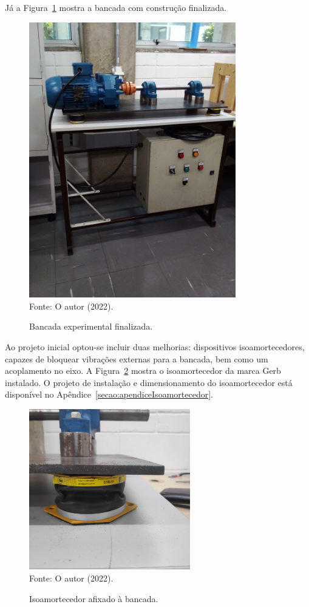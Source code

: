 \documentclass[
	12pt,				
	oneside,			
	a4paper,			
	english,			
	brazil,			
	]{abntex2ppgsi}
\begin{document}
Já a Figura~\ref{bancada_completa} mostra a bancada com construção finalizada.

\begin{figure}[H]
\centering
\caption {Bancada experimental finalizada.}
\includegraphics[width=\textwidth,height=120mm,keepaspectratio,angle=-90]{bancada_completa} \\
Fonte: O autor (2022).
\label{bancada_completa}
\end{figure}

Ao projeto inicial optou-se incluir duas melhorias: dispositivos isoamortecedores, capazes de bloquear vibrações externas para a bancada, bem como um acoplamento no eixo. A Figura~\ref{isoamortecedor_bancada} mostra o isoamortecedor da marca Gerb instalado. O projeto de instalação e dimensionamento do isoamortecedor está disponível no Apêndice~\ref{secao:apendiceIsoamortecedor}. 
 
\begin{figure}[H]
\centering
\caption {Isoamortecedor afixado à bancada.}
\includegraphics[width=\textwidth,height=70mm,keepaspectratio]{isoamortecedor_bancada} \\
Fonte: O autor (2022).
\label{isoamortecedor_bancada}
\end{figure}
\end{document}
